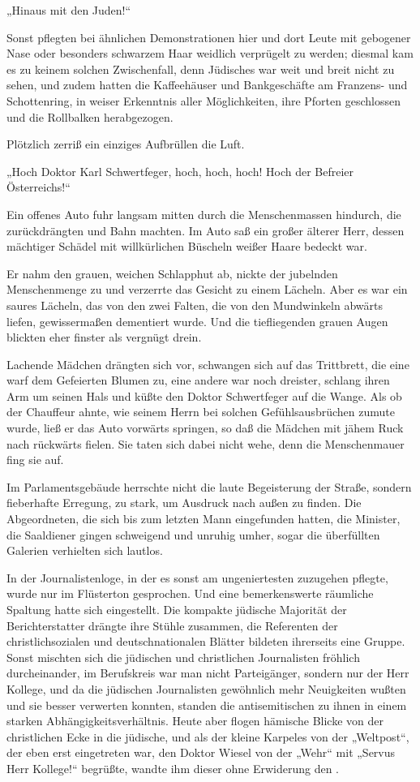 „Hinaus mit den Juden!“

Sonst pflegten bei ähnlichen Demonstrationen hier und dort Leute
mit gebogener Nase oder besonders schwarzem Haar weidlich
verprügelt zu werden; diesmal kam es zu keinem solchen
Zwischenfall, denn Jüdisches war weit und breit nicht zu sehen, und
zudem hatten die Kaffeehäuser und Bankgeschäfte am Franzens- und
Schottenring, in weiser Erkenntnis aller Möglichkeiten, ihre
Pforten geschlossen und die Rollbalken herabgezogen.

Plötzlich zerriß ein einziges Aufbrüllen die Luft.

„Hoch Doktor Karl Schwertfeger, hoch, hoch, hoch! Hoch der Befreier
Österreichs!“

Ein offenes Auto fuhr langsam mitten durch die Menschenmassen
hindurch, die zurückdrängten und Bahn machten. Im Auto saß ein
großer älterer Herr, dessen mächtiger Schädel mit willkürlichen
Büscheln weißer Haare bedeckt war.

Er nahm den grauen, weichen Schlapphut ab, nickte der jubelnden
Menschenmenge zu und verzerrte das Gesicht zu einem Lächeln. Aber
es war ein saures Lächeln, das von den zwei Falten, die von den
Mundwinkeln abwärts liefen, gewissermaßen dementiert wurde. Und die
tiefliegenden grauen Augen blickten eher finster als vergnügt
drein.

Lachende Mädchen drängten sich vor, schwangen sich auf das
Trittbrett, die eine warf dem Gefeierten Blumen zu, eine andere war
noch dreister, schlang ihren Arm um seinen Hals und küßte den
Doktor Schwertfeger auf die Wange. Als ob der Chauffeur ahnte, wie
seinem Herrn bei solchen Gefühlsausbrüchen zumute wurde, ließ er
das Auto vorwärts springen, so daß die Mädchen mit jähem Ruck nach
rückwärts fielen. Sie taten sich dabei nicht wehe, denn die
Menschenmauer fing sie auf.

Im Parlamentsgebäude herrschte nicht die laute Begeisterung der
Straße, sondern fieberhafte Erregung, zu stark, um Ausdruck nach
außen zu finden. Die Abgeordneten, die sich bis zum letzten Mann
eingefunden hatten, die Minister, die Saaldiener gingen schweigend
und unruhig umher, sogar die überfüllten Galerien verhielten sich
lautlos.

In der Journalistenloge, in der es sonst am
ungeniertesten zuzugehen pflegte, wurde nur im Flüsterton
gesprochen. Und eine bemerkenswerte räumliche Spaltung hatte sich
eingestellt. Die kompakte jüdische Majorität der Berichterstatter
drängte ihre Stühle zusammen, die Referenten der christlichsozialen
und deutschnationalen Blätter bildeten ihrerseits eine Gruppe.
Sonst mischten sich die jüdischen und christlichen Journalisten
fröhlich durcheinander, im Berufskreis war man nicht Parteigänger,
sondern nur der Herr Kollege, und da die jüdischen Journalisten
gewöhnlich mehr Neuigkeiten wußten und sie besser verwerten
konnten, standen die antisemitischen zu ihnen in einem starken
Abhängigkeitsverhältnis. Heute aber flogen hämische Blicke von der
christlichen Ecke in die jüdische, und als der kleine Karpeles von
der „Weltpost“, der eben erst eingetreten war, den Doktor Wiesel
von der „Wehr“ mit „Servus Herr Kollege!“ begrüßte, wandte ihm
dieser ohne Erwiderung den .

